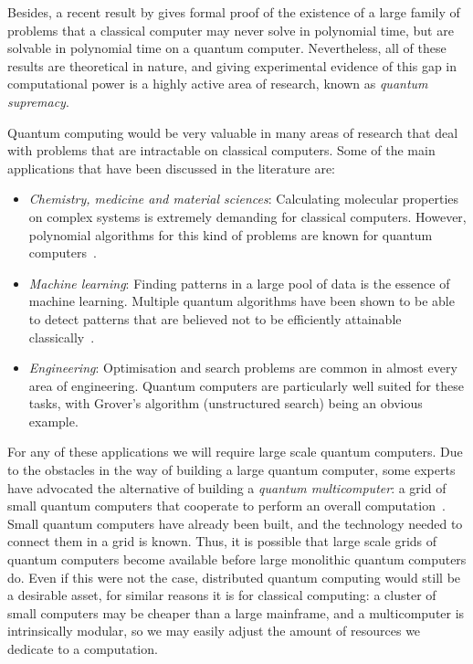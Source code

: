 Besides, a recent result by \citet{BQPSepPH} gives formal proof of the existence of a large family of problems that a classical computer may never solve in polynomial time, but are solvable in polynomial time on a quantum computer. Nevertheless, all of these results are theoretical in nature, and giving experimental evidence of this gap in computational power is a highly active area of research, known as \textit{quantum supremacy}. 

Quantum computing would be very valuable in many areas of research that deal with problems that are intractable on classical computers. Some of the main applications that have been discussed in the literature are:

\begin{itemize}
\item \textit{Chemistry, medicine and material sciences}: Calculating molecular properties on complex systems is extremely demanding for classical computers. However, polynomial algorithms for this kind of problems are known for quantum computers~\citep{TowardsQuantumChemistry}. %
\item \textit{Machine learning}: Finding patterns in a large pool of data is the essence of machine learning. Multiple quantum algorithms have been shown to be able to detect patterns that are believed not to be efficiently attainable classically~\citep{QuantumMachineLearning}.
\item \textit{Engineering}: Optimisation and search problems are common in almost every area of engineering. Quantum computers are particularly well suited for these tasks, with Grover's algorithm (unstructured search) being an obvious example.
\end{itemize}

For any of these applications we will require large scale quantum computers. Due to the obstacles in the way of building a large quantum computer, some experts have advocated the alternative of building a \textit{quantum multicomputer}: a grid of small quantum computers that cooperate to perform an overall computation~\citep{DistributedQCHW}. Small quantum computers have already been built, and the technology needed to connect them in a grid is known. Thus, it is possible that large scale grids of quantum computers become available before large monolithic quantum computers do. Even if this were not the case, distributed quantum computing would still be a desirable asset, for similar reasons it is for classical computing: a cluster of small computers may be cheaper than a large mainframe, and a multicomputer is intrinsically modular, so we may easily adjust the amount of resources we dedicate to a computation.

